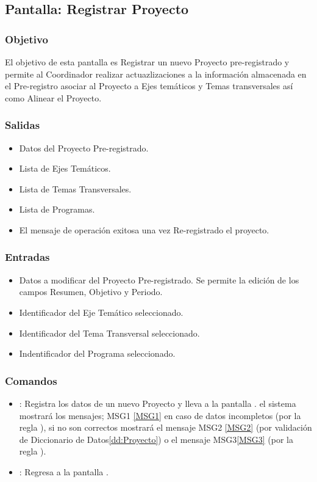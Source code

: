 \subsection{Pantalla: Registrar Proyecto}

\subsubsection{Objetivo}
El objetivo de esta pantalla es Registrar un nuevo Proyecto pre-registrado y permite al Coordinador realizar actuazlizaciones a la información almacenada en el Pre-registro asociar al Proyecto a Ejes temáticos y Temas transversales así como Alinear el Proyecto.


\subsubsection{Salidas}
\begin{itemize}
 \item Datos del Proyecto Pre-registrado.
 \item Lista de Ejes Temáticos.
 \item Lista de Temas Transversales.
 \item Lista de Programas.
 \item El mensaje de operación exitosa una vez Re-registrado el proyecto.
\end{itemize}

\subsubsection{Entradas}
\begin{itemize}
 \item Datos a modificar del Proyecto Pre-registrado. Se permite la edición de los campos Resumen, Objetivo y Periodo.
 \item Identificador del Eje Temático seleccionado.
 \item Identificador del Tema Transversal seleccionado.
 \item Indentificador del Programa seleccionado.
\end{itemize}

\subsubsection{Comandos}
\begin{itemize}
 \item {}: Registra los datos de un nuevo Proyecto y lleva a la pantalla .  el sistema mostrará los mensajes; MSG1 \ref{MSG1} en caso de datos incompletos (por la regla ), si no son correctos mostrará el mensaje MSG2 \ref{MSG2} (por validación de Diccionario de Datos\ref{dd:Proyecto}) o el mensaje MSG3\ref{MSG3} (por la regla ).
 \item {}: Regresa a la pantalla .
\end{itemize}